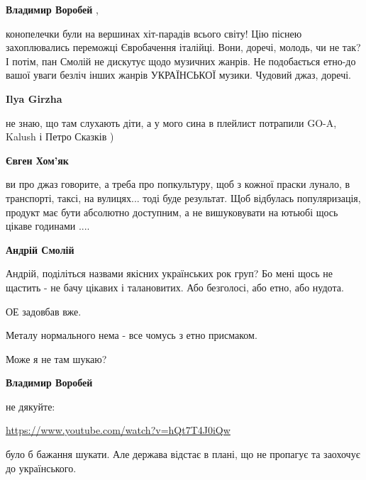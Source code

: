 \begin{itemize}
\begin{itemize}
\textbf{Владимир Воробей} , 

конопелечки були на вершинах хіт-парадів всього світу! Цію піснею захоплювались
переможці Євробачення італійці. Вони, доречі, молодь, чи не так? І потім, пан
Смолій не дискутує щодо музичних жанрів. Не подобається етно-до вашої уваги
безліч інших жанрів УКРАЇНСЬКОЇ музики. Чудовий джаз, доречі.


\textbf{Ilya Girzha} 

не знаю, що там слухають діти, а у мого сина в плейлист потрапили GO-A, Kalush
і Петро Сказків )


\textbf{Євген Хом'як} 

ви про джаз говорите, а треба про попкультуру, щоб з кожної праски лунало, в
транспорті, таксі, на вулицях... тоді буде результат. Щоб відбулась
популяризація, продукт має бути абсолютно доступним, а не вишуковувати на
ютьюбі щось цікаве годинами ....

\textbf{Андрій Смолій} 

Андрій, поділіться назвами якісних українських рок груп? Бо мені щось не
щастить - не бачу цікавих і талановитих. Або безголосі, або етно, або нудота.

ОЕ задовбав вже.

Металу нормального нема - все чомусь з етно присмаком.

Може я не там шукаю?

\textbf{Владимир Воробей} 

не дякуйте:

\url{https://www.youtube.com/watch?v=hQt7T4J0iQw}

було б бажання шукати. Але держава відстає в плані, що не пропагує та заохочує
до українського.


\end{itemize} %


\end{itemize} %
